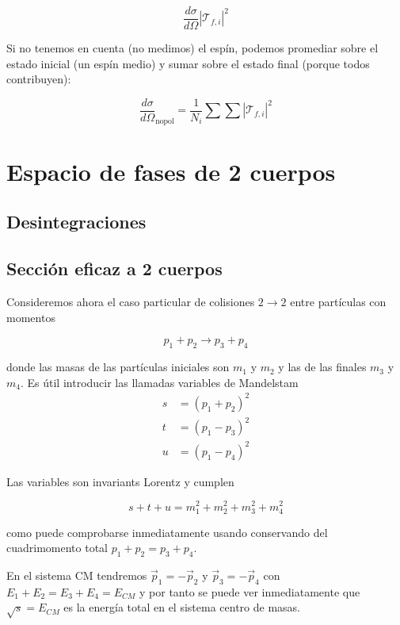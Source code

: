 $$
\frac{d\sigma}{d\Omega} \left| \mathcal{T}_{f,i} \right|^2
$$

Si no tenemos en cuenta (no medimos) el espín, podemos promediar sobre el estado inicial (un espín medio) y sumar sobre el estado final (porque todos contribuyen):

$$
\frac{d\sigma}{d\Omega}_{\text{nopol}} = \frac{1}{N_i} \sum \sum \left| \mathcal{T}_{f,i} \right|^2
$$
\section{Espacio de fases de 2 cuerpos}
\subsection{Desintegraciones}
\subsection{Sección eficaz a 2 cuerpos}
Consideremos ahora el caso particular de colisiones $2 \rightarrow 2$ entre partículas con momentos

\begin{equation*}
p_{1}+p_{2} \rightarrow p_{3}+p_{4} \tag{7.64}
\end{equation*}


donde las masas de las partículas iniciales son $m_{1}$ y $m_{2}$ y las de las finales $m_{3}$ y $m_{4}$. Es útil introducir las llamadas variables de Mandelstam
$$
\begin{align*}
s & =\left(p_{1}+p_{2}\right)^{2}  \tag{7.65}\\
t & =\left(p_{1}-p_{3}\right)^{2}  \tag{7.66}\\
u & =\left(p_{1}-p_{4}\right)^{2} \tag{7.67}
\end{align*}
$$

Las variables son invariants Lorentz y cumplen

\begin{equation*}
s+t+u=m_{1}^{2}+m_{2}^{2}+m_{3}^{2}+m_{4}^{2} \tag{7.68}
\end{equation*}

como puede comprobarse inmediatamente usando conservando del cuadrimomento total $p_{1}+p_{2}=p_{3}+p_{4}$.

En el sistema CM tendremos $\vec{p}_{1}=-\vec{p}_{2}$ y $\vec{p}_{3}=-\vec{p}_{4}$ con $E_{1}+E_{2}=E_{3}+E_{4}=E_{C M}$ y por tanto se puede ver inmediatamente que $\sqrt{s}=E_{C M}$ es la energía total en el sistema centro de masas.

